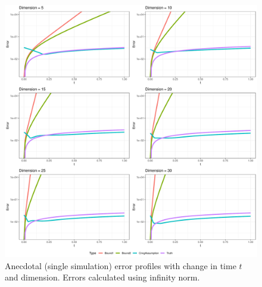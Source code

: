 \documentclass[12pt]{article} %
\begin{document}
\begin{figure}[!p]
	\centering
	\includegraphics[width=\linewidth]{infinityScaling.pdf}
	\caption{Anecdotal (single simulation) error profiles with change in time $t$ and dimension. Errors calculated using infinity norm.}\label{fig:inf}
\end{figure}





\end{document}
